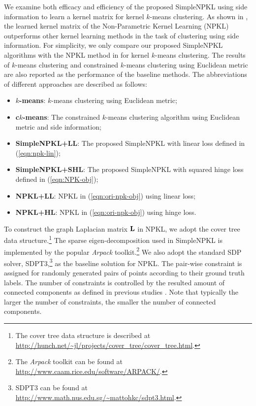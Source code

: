 We examine both efficacy and efficiency of the proposed SimpleNPKL using side information to learn a kernel matrix for kernel $k$-means clustering.
As shown in \cite{icml/HoiJL07}, the learned kernel matrix of the Non-Parametric Kernel Learning (NPKL)
outperforms other kernel learning methods in the task of clustering using side information. For simplicity, we only compare  our
proposed SimpleNPKL algorithms with  the NPKL method in \cite{icml/HoiJL07}
for kernel $k$-means clustering.
The results of $k$-means clustering and constrained $k$-means clustering using Euclidean metric are also reported as the performance of the
baseline methods. The abbreviations of different approaches are described as follows:
\begin{itemize}
  \item {\bf $k$-means}: $k$-means clustering using Euclidean metric; \vspace{-0.1in}
  \item {\bf c$k$-means}: The constrained $k$-means clustering algorithm using Euclidean metric and side information; \vspace{-0.1in}
  \item {\bf SimpleNPKL+LL}: The proposed SimpleNPKL with linear loss defined in (\ref{eqn:npk-lin});                         \vspace{-0.1in}
  \item {\bf SimpleNPKL+SHL}: The proposed SimpleNPKL with squared hinge loss defined in (\ref{eqn:NPK-obj}); \vspace{-0.1in}
  \item {\bf NPKL+LL}: NPKL in (\ref{eqn:ori-npk-obj})  using linear loss;                              \vspace{-0.1in}
  \item {\bf NPKL+HL}: NPKL in (\ref{eqn:ori-npk-obj}) using hinge
  loss. %
\end{itemize}

To construct the graph Laplacian matrix ${\bf L}$ in NPKL, we adopt the cover tree data structure.\footnote{The cover tree data structure is described at \url{http://hunch.net/~jl/projects/cover_tree/cover_tree.html}.}
The sparse eigen-decomposition used in SimpleNPKL is implemented by the popular {\em Arpack} toolkit.\footnote{The {\em Arpack} toolkit can be found at \url{http://www.caam.rice.edu/software/ARPACK/}.} We also
adopt the standard SDP solver, SDPT3,\footnote{SDPT3 can be found at \url{http://www.math.nus.edu.sg/~mattohkc/sdpt3.html}.} as the baseline solution for NPKL. The pair-wise constraint is assigned for randomly generated pairs of
points according to their ground truth labels. The number of constraints is controlled by the resulted amount of connected components as defined in previous studies \cite{nips/XingNJR02,icml/HoiJL07}. Note that typically the larger the number of constraints, the smaller the number of connected components.

